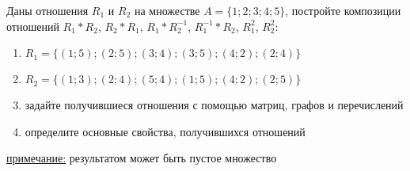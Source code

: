 \question
Даны отношения $R_1$ и $R_2$ на множестве $A = \{1; 2; 3; 4; 5\}$, постройте композиции отношений $R_1*R_2$, $R_2*R_1$,  $R_1*R_2^{-1}$, $R_1^{-1}*R_2$, $R_1^2$, $R_2^2$:
\begin{enumerate}
	\renewcommand{\labelenumi}{\alph{enumi})}
	\item $R_1 = \{(1; 5); (2; 5); (3; 4); (3; 5); (4; 2); (2; 4)\}$
	\item $R_2 = \{(1; 3); (2; 4); (5; 4); (1; 5); (4; 2); (2; 5)\}$
	\item задайте получившиеся отношения с помощью матриц, графов и перечислений 
	\item определите основные свойства, получившихся отношений
\end{enumerate}

\underline{примечание:} результатом может быть пустое множество